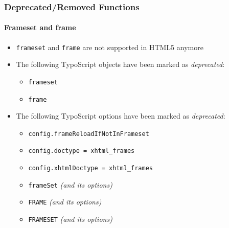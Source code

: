 \begin{frame}[fragile]
	\frametitle{Deprecated/Removed Functions}
	\framesubtitle{Frameset and frame}

	\begin{itemize}
		\item \texttt{frameset} and \texttt{frame} are not supported in HTML5 anymore
		\item The following TypoScript objects have been marked as \textit{deprecated}:

			\begin{itemize}
				\item \texttt{frameset}
				\item \texttt{frame}
			\end{itemize}

		\item The following TypoScript options have been marked as \textit{deprecated}:

			\begin{itemize}
				\item \texttt{config.frameReloadIfNotInFrameset}
				\item \texttt{config.doctype = xhtml\_frames}
				\item \texttt{config.xhtmlDoctype = xhtml\_frames}
				\item \texttt{frameSet} \tabto{1.8cm}\textit{(and its options)}
				\item \texttt{FRAME} \tabto{1.8cm}\textit{(and its options)}
				\item \texttt{FRAMESET} \tabto{1.8cm}\textit{(and its options)}
			\end{itemize}

	\end{itemize}

\end{frame}

